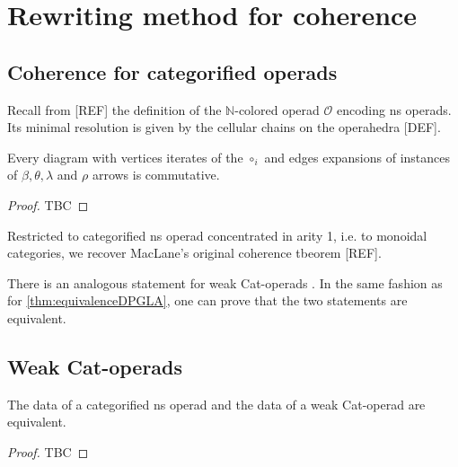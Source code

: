 
\section{Rewriting method for coherence} 
\label{s:catoperads}







\subsection{Coherence for categorified operads}

Recall from [REF] the definition of the $\mathbb{N}$-colored operad $\mathcal{O}$ encoding ns operads. Its minimal resolution is given by the cellular chains on the operahedra [DEF]. 


\begin{thm} \label{thm:coherence}
    Every diagram with vertices iterates of the $\circ_i$ and edges expansions of instances of $\beta, \theta, \lambda$ and $\rho$ arrows is commutative. 
\end{thm}

\begin{proof} TBC
\end{proof}

Restricted to categorified ns operad concentrated in arity 1, i.e. to monoidal categories, we recover MacLane's original coherence tbeorem [REF].

There is an analogous statement for weak Cat-operads \cite[Proposition 14.2]{DP15}. In the same fashion as for \cref{thm:equivalenceDPGLA}, one can prove that the two statements are equivalent. 


\subsection{Weak Cat-operads}

\begin{definition}
\end{definition}

\begin{thm} \label{thm:equivalenceDPGLA}
    The data of a categorified ns operad and the data of a weak Cat-operad are equivalent.  
\end{thm}

\begin{proof}
    TBC
\end{proof}



